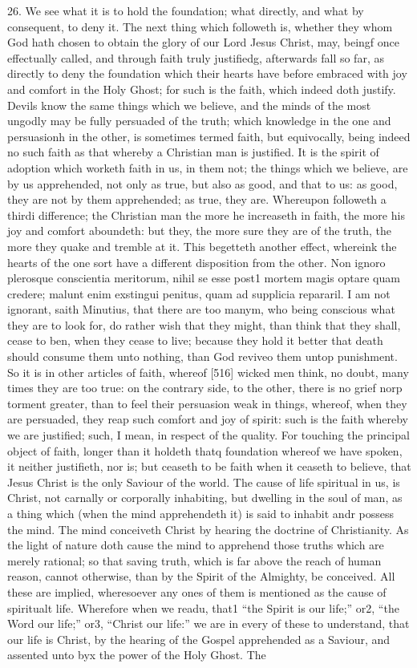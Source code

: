 26. We see what it is to hold the foundation; what directly, and what by consequent, to deny it. The next thing which followeth is, whether they whom God hath chosen to obtain the glory of our Lord Jesus Christ, may, beingf once effectually called, and through faith truly justifiedg, afterwards fall so far, as directly to deny the foundation which their hearts have before embraced with joy and comfort in the Holy Ghost; for such is the faith, which indeed doth justify. Devils know the same things which we believe, and the minds of the most ungodly may be fully persuaded of the truth; which knowledge in the one and persuasionh in the other, is sometimes termed faith, but equivocally, being indeed no such faith as that whereby a Christian man is justified. It is the spirit of adoption which worketh faith in us, in them not; the things which we believe, are by us apprehended, not only as true, but also as good, and that to us: as good, they are not by them apprehended; as true, they are. Whereupon followeth a thirdi difference; the Christian man the more he increaseth in faith, the more his joy and comfort aboundeth: but they, the more sure they are of the truth, the more they quake and tremble at it. This begetteth another effect, whereink the hearts of the one sort have a different disposition from the other. Non ignoro plerosque conscientia meritorum, nihil se esse post1 mortem magis optare quam credere; malunt enim exstingui penitus, quam ad supplicia repararil. I am not ignorant, saith Minutius, that there are too manym, who being conscious what they are to look for, do rather wish that they might, than think that they shall, cease to ben, when they cease to live; because they hold it better that death should consume them unto nothing, than God reviveo them untop punishment. So it is in other articles of faith, whereof [516] wicked men think, no doubt, many times they are too true: on the contrary side, to the other, there is no grief norp torment greater, than to feel their persuasion weak in things, whereof, when they are persuaded, they reap such comfort and joy of spirit: such is the faith whereby we are justified; such, I mean, in respect of the quality. For touching the principal object of faith, longer than it holdeth thatq foundation whereof we have spoken, it neither justifieth, nor is; but ceaseth to be faith when it ceaseth to believe, that Jesus Christ is the only Saviour of the world. The cause of life spiritual in us, is Christ, not carnally or corporally inhabiting, but dwelling in the soul of man, as a thing which (when the mind apprehendeth it) is said to inhabit andr possess the mind. The mind conceiveth Christ by hearing the doctrine of Christianity. As the light of nature doth cause the mind to apprehend those truths which are merely rational; so that saving truth, which is far above the reach of human reason, cannot otherwise, than by the Spirit of the Almighty, be conceived. All these are implied, wheresoever any ones of them is mentioned as the cause of spiritualt life. Wherefore when we readu, that1 “the Spirit is our life;” or2, “the Word our life;” or3, “Christ our life:” we are in every of these to understand, that our life is Christ, by the hearing of the Gospel apprehended as a Saviour, and assented unto byx the power of the Holy Ghost. The 